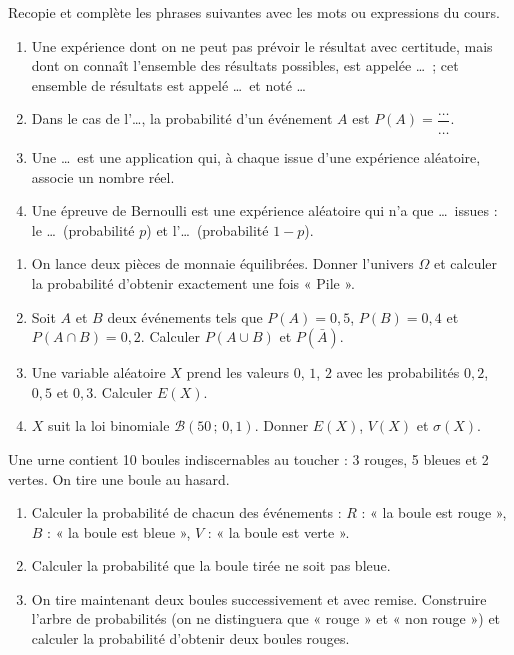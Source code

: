 \documentclass[11pt]{article}
\newcounter{popsec}
\newcounter{popsub}
\newcommand{\courssub}[1]{%
  \stepcounter{popsub}%
  \par\vspace{9pt}\noindent{\popxbold\fontsize{11.5}{13}\selectfont\color{popink}{\color{poporange}\thepopsec.\thepopsub}\hspace{6pt}#1}\par\nopagebreak\vspace{4pt}
}
\begin{document}
\begin{exercice}
Recopie et complète les phrases suivantes avec les mots ou expressions du cours.
\begin{enumerate}
\item Une expérience dont on ne peut pas prévoir le résultat avec certitude, mais dont on connaît l'ensemble des résultats possibles, est appelée \ldots\ ; cet ensemble de résultats est appelé \ldots\ et noté \ldots
\item Dans le cas de l'\ldots, la probabilité d'un événement $A$ est $P(A)=\dfrac{\ldots}{\ldots}$.
\item Une \ldots\ est une application qui, à chaque issue d'une expérience aléatoire, associe un nombre réel.
\item Une épreuve de Bernoulli est une expérience aléatoire qui n'a que \ldots\ issues : le \ldots\ (probabilité $p$) et l'\ldots\ (probabilité $1-p$).
\end{enumerate}
\end{exercice}

\begin{exercice}
\begin{enumerate}
\item On lance deux pièces de monnaie équilibrées. Donner l'univers $\Omega$ et calculer la probabilité d'obtenir exactement une fois « Pile ».
\item Soit $A$ et $B$ deux événements tels que $P(A)=0{,}5$, $P(B)=0{,}4$ et $P(A\cap B)=0{,}2$. Calculer $P(A\cup B)$ et $P(\bar{A})$.
\item Une variable aléatoire $X$ prend les valeurs $0$, $1$, $2$ avec les probabilités $0{,}2$, $0{,}5$ et $0{,}3$. Calculer $E(X)$.
\item $X$ suit la loi binomiale $\mathcal{B}(50\,;\,0{,}1)$. Donner $E(X)$, $V(X)$ et $\sigma(X)$.
\end{enumerate}
\end{exercice}

\courssub{Je m'entraîne}

\begin{exercice}
Une urne contient 10 boules indiscernables au toucher : 3 rouges, 5 bleues et 2 vertes. On tire une boule au hasard.
\begin{enumerate}
\item Calculer la probabilité de chacun des événements : $R$ : « la boule est rouge », $B$ : « la boule est bleue », $V$ : « la boule est verte ».
\item Calculer la probabilité que la boule tirée ne soit pas bleue.
\item On tire maintenant deux boules successivement et avec remise. Construire l'arbre de probabilités (on ne distinguera que « rouge » et « non rouge ») et calculer la probabilité d'obtenir deux boules rouges.
\end{enumerate}
\end{exercice}
\end{document}
